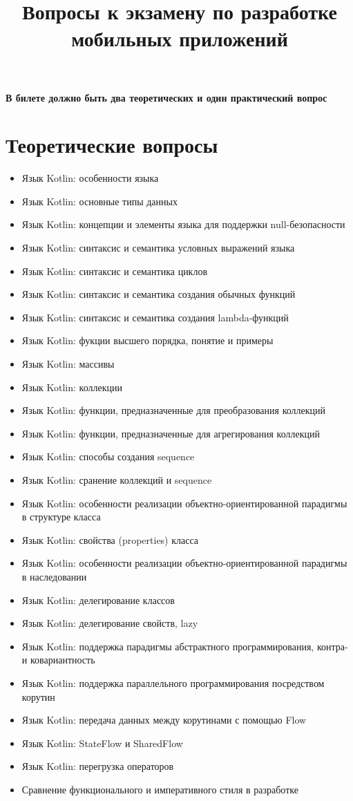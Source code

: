 \documentclass[a4paper,12pt]{article}
\title{Вопросы к экзамену по разработке мобильных приложений}
\author{}
\date{}
\begin{document}
\maketitle

\textbf{В билете должно быть два теоретических и один практический вопрос}

\section*{Теоретические вопросы}
\begin{itemize}
    \item Язык Kotlin: особенности языка
    \item Язык Kotlin: основные типы данных
    \item Язык Kotlin: концепции и элементы языка для поддержки null-безопасности
    \item Язык Kotlin: синтаксис и семантика условных выражений языка
    \item Язык Kotlin: синтаксис и семантика циклов
    \item Язык Kotlin: синтаксис и семантика создания обычных функций
    \item Язык Kotlin: синтаксис и семантика создания lambda-функций
    \item Язык Kotlin: фукции высшего порядка, понятие и примеры
    \item Язык Kotlin: массивы
    \item Язык Kotlin: коллекции
    \item Язык Kotlin: функции, предназначенные для преобразования коллекций
    \item Язык Kotlin: функции, предназначенные для агрегирования коллекций
    \item Язык Kotlin: способы создания sequence
    \item Язык Kotlin: сранение коллекций и sequence
    \item Язык Kotlin: особенности реализации объектно-ориентированной парадигмы в структуре класса
    \item Язык Kotlin: свойства (properties) класса
    \item Язык Kotlin: особенности реализации объектно-ориентированной парадигмы в наследовании
    \item Язык Kotlin: делегирование классов
    \item Язык Kotlin: делегирование свойств, lazy
    \item Язык Kotlin: поддержка парадигмы абстрактного программирования, контра- и ковариантность
    \item Язык Kotlin: поддержка параллельного программирования посредством корутин
    \item Язык Kotlin: передача данных между корутинами с помощью Flow
    \item Язык Kotlin: StateFlow и SharedFlow
    \item Язык Kotlin: перегрузка операторов
    \item Сравнение функционального и императивного стиля в разработке
\end{itemize}
\end{document}
